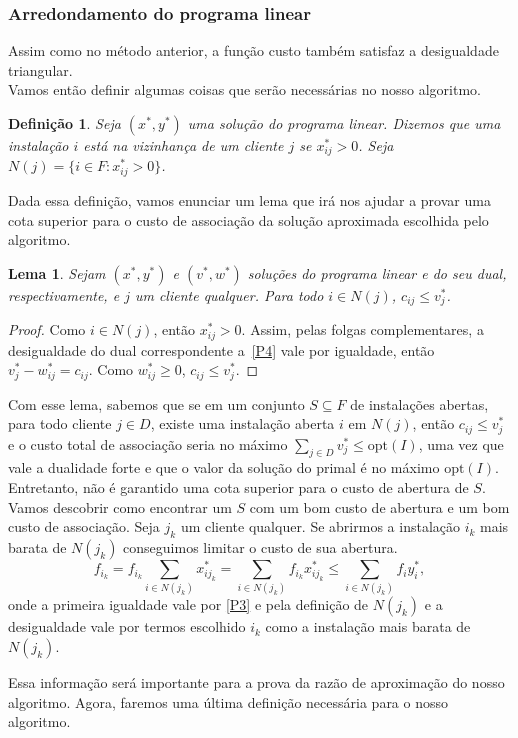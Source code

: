 \documentclass[12pt]{article}
\newcommand{\opt}{\ensuremath{\mathrm{opt}}}
\newtheorem{lemma}[theorem]{Lema}
\newtheorem{definition}[theorem]{Definição}
\begin{document}
\subsubsection{Arredondamento do programa linear}
Assim como no método anterior, a função custo também satisfaz a desigualdade triangular. \\
Vamos então definir algumas coisas que serão necessárias no nosso algoritmo.
\begin{definition}
    Seja $(x^*,y^*)$ uma solução do programa linear. Dizemos que uma instalação $i$ está na \emph{vizinhança} de um cliente $j$ se $x^*_{ij} > 0$. Seja $N(j) = \{ i \in F : x^*_{ij} > 0\}$.
\end{definition}
Dada essa definição, vamos enunciar um lema que irá nos ajudar a provar uma cota superior para o custo de associação da solução aproximada escolhida pelo algoritmo.
\begin{lemma}\label{lemma:3.5}
    Sejam $(x^*,y^*)$ e $(v^*,w^*)$ soluções do programa linear e do seu dual, respectivamente, e $j$ um cliente qualquer. Para todo $i \in N(j)$, $c_{ij} \leq v^*_j$.
\end{lemma}
\begin{proof}
    Como $i \in N(j)$, então $x^*_{ij}>0$. Assim, pelas folgas complementares, a desigualdade do dual correspondente a~\ref{P4} vale por igualdade, então $v^*_j - w^*_{ij} = c_{ij}$. Como $w^*_{ij} \geq 0$, $c_{ij} \leq v^*_j$. 
\end{proof}
Com esse lema, sabemos que se em um conjunto $S \subseteq F$ de instalações abertas, para todo cliente $j \in D$, existe uma instalação aberta $i$ em $N(j)$, então $c_{ij}\leq v_j^*$ e o custo total de associação seria no máximo $\sum_{j\in D}v_j^* \leq \opt(I)$, uma vez que vale a dualidade forte e que o valor da solução do primal é no máximo $\opt(I)$. Entretanto, não é garantido uma cota superior para o custo de abertura de $S$. Vamos descobrir como encontrar um $S$ com um bom custo de abertura e um bom custo de associação. Seja $j_k$ um cliente qualquer. Se abrirmos a instalação $i_k$ mais barata de $N(j_k)$ conseguimos limitar o custo de sua abertura.
\[\tag{*} \label{relx_fl:*}
    f_{i_k} = f_{i_k} \sum_{i \in N(j_k)}x^*_{ij_k} = \sum_{i \in N(j_k)}f_{i_k}x^*_{ij_k} \leq \sum_{i \in N(j_k)}f_{i}y^*_{i},
\]
onde a primeira igualdade vale por \ref{P3} e pela definição de $N(j_k)$ e a desigualdade vale por termos escolhido $i_k$ como a instalação mais barata de $N(j_k)$.

Essa informação será importante para a prova da razão de aproximação do nosso algoritmo. Agora, faremos uma última definição necessária para o nosso algoritmo.
\end{document}
